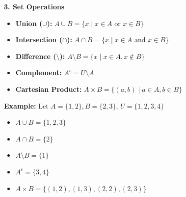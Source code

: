 \begin{tcolorbox}[sectionbox]
\textbf{3. Set Operations}
\begin{itemize}
    \item \textbf{Union ($\cup$):} $A \cup B = \{x \mid x \in A \text{ or } x \in B\}$
    \item \textbf{Intersection ($\cap$):} $A \cap B = \{x \mid x \in A \text{ and } x \in B\}$
    \item \textbf{Difference ($\setminus$):} $A \setminus B = \{x \mid x \in A, x \notin B\}$
    \item \textbf{Complement:} $A^c = U \setminus A$
    \item \textbf{Cartesian Product:} $A \times B = \{(a,b) \mid a \in A, b \in B\}$
\end{itemize}
\end{tcolorbox}

\begin{tcolorbox}[examplebox]
\textbf{Example:} Let $A=\{1,2\}, B=\{2,3\}$, $U=\{1,2,3,4\}$
\begin{itemize}
    \item $A \cup B = \{1,2,3\}$
    \item $A \cap B = \{2\}$
    \item $A \setminus B = \{1\}$
    \item $A^c = \{3,4\}$
    \item $A \times B = \{(1,2),(1,3),(2,2),(2,3)\}$
\end{itemize}
\end{tcolorbox}

